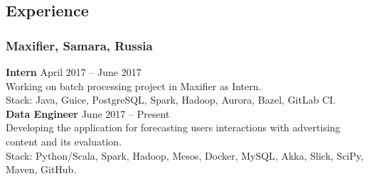 \subsection*{Experience}
    \subsubsection*{Maxifier, Samara, Russia}
    \textbf{Intern} \hfill April 2017 -- June 2017\\
    Working on batch processing project in Maxifier as Intern. \\
    Stack: Java, Guice, PostgreSQL, Spark, Hadoop, Aurora, Bazel, GitLab CI. \\
    \textbf{Data Engineer} \hfill June 2017 -- Present\\
    Developing the application for forecasting users interactions with advertising content and its evaluation. \\
    Stack: Python/Scala, Spark, Hadoop, Mesos, Docker, MySQL, Akka, Slick, SciPy, Maven, GitHub.
